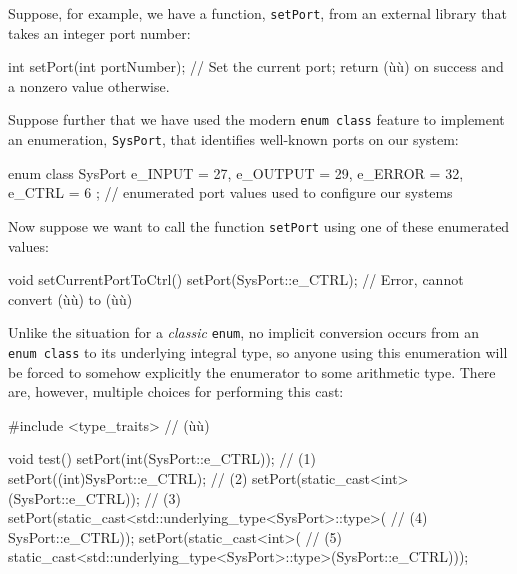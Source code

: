 Suppose, for example, we have a function, \lstinline!setPort!, from an
external library that takes an integer port number:

\begin{emcppslisting}[emcppsbatch=e11]
int setPort(int portNumber);
    // Set the current port; return (ù{}ù) on success and a nonzero value otherwise.
\end{emcppslisting}

\noindent Suppose further that we have used the modern
\lstinline!enum!~\lstinline!class! feature to implement an enumeration,
\lstinline!SysPort!, that identifies well-known ports on our system:

\begin{emcppslisting}[emcppsbatch=e11]
enum class SysPort { e_INPUT = 27, e_OUTPUT = 29, e_ERROR = 32, e_CTRL = 6 };
    // enumerated port values used to configure our systems
\end{emcppslisting}

\noindent Now suppose we want to call the function \lstinline!setPort! using one of these
enumerated values:

\begin{emcppslisting}[emcppsbatch=e11]
void setCurrentPortToCtrl()
{
    setPort(SysPort::e_CTRL);  // Error, cannot convert (ù{}ù) to (ù{}ù)
}
\end{emcppslisting}

\noindent Unlike the situation for a \emph{classic} \lstinline!enum!, no implicit
conversion occurs from an \lstinline!enum!~\lstinline!class! to its underlying
integral type, so anyone using this enumeration will be forced to
somehow explicitly  the enumerator to some arithmetic type.
There are, however, multiple choices for performing this cast:

\begin{emcppslisting}[emcppsbatch=e11]
#include <type_traits>  // (ù{}ù)

void test()
{
    setPort(int(SysPort::e_CTRL));                                       // (1)
    setPort((int)SysPort::e_CTRL);                                       // (2)
    setPort(static_cast<int>(SysPort::e_CTRL));                          // (3)
    setPort(static_cast<std::underlying_type<SysPort>::type>(            // (4)
                                                         SysPort::e_CTRL));
    setPort(static_cast<int>(                                            // (5)
             static_cast<std::underlying_type<SysPort>::type>(SysPort::e_CTRL)));
}
\end{emcppslisting}

